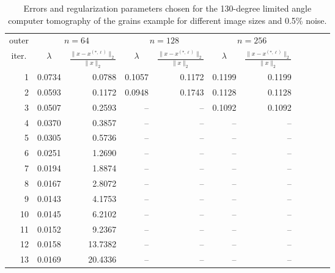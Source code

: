 \begin{table}[htp]
\caption{Errors and regularization parameters chosen for the 130-degree limited angle computer tomography of the grains example for different image sizes and 0.5\% noise.}
\begin{center}
\begin{tabular}{|r|r|r|r|r|r|r|r|r|r|r|}
\hline
\multicolumn{1}{|c|}{outer} & \multicolumn{2}{c|}{$n = 64$} & \multicolumn{2}{c|}{$n = 128$} & \multicolumn{2}{c|}{$n = 256$} \\\cline{2-7}
\multicolumn{1}{|c|}{iter.} & \multicolumn{1}{c|}{$\lambda$} & \multicolumn{1}{c|}{$\frac{\|x - x^{(*,\ell)}\|_2}{\|x\|_2}$} & \multicolumn{1}{c|}{$\lambda$} & \multicolumn{1}{c|}{$\frac{\|x - x^{(*,\ell)}\|_2}{\|x\|_2}$}  & \multicolumn{1}{c|}{$\lambda$} & \multicolumn{1}{c|}{$\frac{\|x - x^{(*,\ell)}\|_2}{\|x\|_2}$} \\
\hline
1 & 0.0734 & 0.0788 & 0.1057 & 0.1172 & 0.1199 & 0.1199 \\
2 & 0.0593 & 0.1172 & 0.0948 & 0.1743 & 0.1128 & 0.1128 \\
3 & 0.0507 & 0.2593 & -- & -- & 0.1092 & 0.1092 \\
4 & 0.0370 & 0.3857 & -- & -- & -- & -- \\
5 & 0.0305 & 0.5736 & -- & -- & -- & -- \\
6 & 0.0251 & 1.2690 & -- & -- & -- & -- \\
7 & 0.0194 & 1.8874 & -- & -- & -- & -- \\
8 & 0.0167 & 2.8072 & -- & -- & -- & -- \\
9 & 0.0143 & 4.1753 & -- & -- & -- & -- \\
10 & 0.0145 & 6.2102 & -- & -- & -- & -- \\
11 & 0.0152 & 9.2367 & -- & -- & -- & -- \\
12 & 0.0158 & 13.7382 & -- & -- & -- & -- \\
13 & 0.0169 & 20.4336 & -- & -- & -- & -- \\\hline
\end{tabular}
\end{center}
\label{tab:limited_angle_grains_errs_and_reg_params}
\end{table}%
